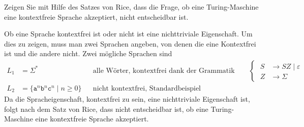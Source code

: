 Zeigen Sie mit Hilfe des Satzes von Rice, dass die Frage, ob eine
Turing-Maschine eine kontextfreie Sprache akzeptiert, nicht entscheidbar
ist.


\begin{loesung}
Ob eine Sprache kontextfrei ist oder nicht ist eine nichttriviale
Eigenschaft.
Um dies zu zeigen, muss man zwei Sprachen angeben, von denen die eine
Kontextfrei ist und die andere nicht.
Zwei mögliche Sprachen sind
\begin{align*}
L_1
&=
\Sigma^*&&\text{alle Wörter, kontextfrei dank der Grammatik}
\qquad
\left\{
\;
\begin{aligned}
S&\to SZ\mid \varepsilon\\
Z&\to \Sigma
\end{aligned}
\right.
\\
L_2
&=
\{\texttt{a}^n\texttt{b}^n\texttt{c}^n
\mid
n\ge 0
\}
&&\text{nicht kontextfrei, Standardbeispiel}
\end{align*}
Da die Spracheigenschaft, kontextfrei zu sein, eine nichttriviale
Eigenschaft ist, folgt nach dem Satz von Rice, dass nicht entscheidbar
ist, ob eine Turing-Maschine eine kontextfreie Sprache akzeptiert.
\end{loesung}
